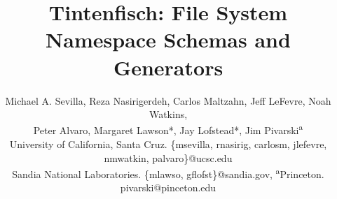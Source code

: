 \documentclass[letterpaper,twocolumn,10pt]{article}
\begin{document}
\date{}

\title{Tintenfisch: File System Namespace Schemas and Generators\vspace{-1em}}

\author{
{\rm Michael A. Sevilla, Reza Nasirigerdeh, Carlos Maltzahn, Jeff LeFevre, Noah Watkins,}\\
{\rm Peter Alvaro, Margaret Lawson*, Jay Lofstead*, Jim Pivarski\textsuperscript{a}}\\
{\small University of California, Santa Cruz. \{msevilla, rnasirig, carlosm, jlefevre, nmwatkin, palvaro\}@ucsc.edu}\\
{\small *Sandia National Laboratories. \{mlawso, gflofst\}@sandia.gov, \textsuperscript{a}Princeton. pivarski@pinceton.edu}
} %

\maketitle




%




{\footnotesize 
}
\end{document}
